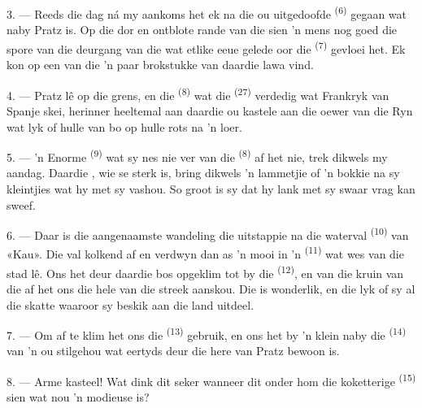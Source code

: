 3. --- Reeds die dag ná my aankoms het ek na die ou uitgedoofde 
\textsuperscript{(6)} gegaan wat naby Pratz is. Op die dor en ontblote rande van die
 sien 'n mens nog goed die spore van die deurgang van die 
wat etlike eeue gelede oor die  \textsuperscript{(7)} gevloei het. Ek kon
op een van die  'n paar brokstukke van daardie lawa vind.

4. --- Pratz lê op die grens, en die  \textsuperscript{(8)} wat die
 \textsuperscript{(27)} verdedig wat Frankryk van Spanje skei, herinner
heeltemal aan daardie ou kastele aan die oewer van die Ryn wat lyk of hulle van bo op
hulle rots na 'n  loer.

5. --- 'n Enorme  \textsuperscript{(9)} wat sy nes nie ver van die
 \textsuperscript{(8)} af het nie, trek dikwels my aandag. Daardie
, wie se  sterk is, bring dikwels 'n lammetjie of 'n
bokkie na sy kleintjies wat hy met sy  vashou. So groot is sy
 dat hy lank met sy swaar vrag kan sweef.

\VUsaut{3.0mm}
\VUsaut{3.0mm}

6. --- Daar is die aangenaamste wandeling die uitstappie na die waterval
\textsuperscript{(10)} van «Kau». Die  val kolkend af en verdwyn dan as
'n mooi  in 'n  \textsuperscript{(11)} wat wes van die
stad lê. Ons het deur daardie bos opgeklim tot by die 
\textsuperscript{(12)}, en van die kruin van die  af het ons die hele
 van die streek aanskou. Die  is wonderlik, en die
 lyk of sy al die skatte waaroor sy beskik aan die land uitdeel.

7. --- Om af te klim het ons die  \textsuperscript{(13)} gebruik, en
ons het by 'n klein  naby die  \textsuperscript{(14)} van 'n
ou  stilgehou wat eertyds deur die here van Pratz bewoon is.

8. --- Arme kasteel! Wat dink dit seker wanneer dit onder hom die koketterige
 \textsuperscript{(15)} sien wat nou 'n modieuse  is?

